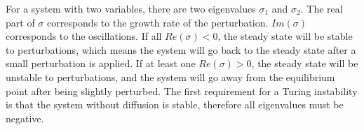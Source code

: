 For a system with two variables, there are two eigenvalues $\sigma_{1}$ and $\sigma_{2}$.
The real part of $\sigma$ corresponds to the growth rate of the perturbation.
$Im(\sigma)$ corresponds to the oscillations.
If all $Re(\sigma) < 0 $, the steady state will be stable to perturbations, which means the system will go back to the steady state after a small perturbation is applied.
If at least one $Re(\sigma) > 0 $, the steady state will be unstable to perturbations, and the system will go away from the equilibrium point after being slightly perturbed.
The first requirement for a Turing instability is that the system without diffusion is stable, therefore all eigenvalues must be negative.
%
%
%
%
%
%
%
%
